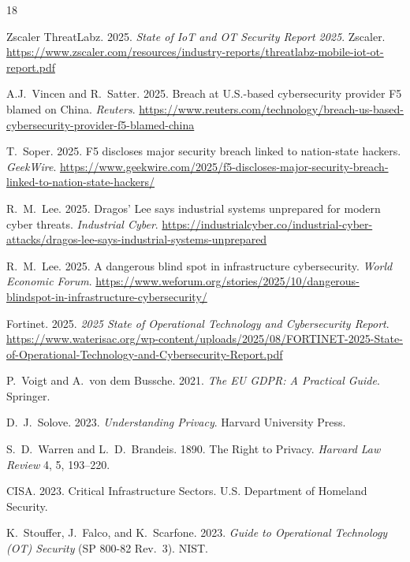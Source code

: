 \documentclass[sigconf,nonacm]{acmart}
\begin{document}
\sloppy

\begin{thebibliography}{18}

Zscaler ThreatLabz. 2025. \textit{State of IoT and OT Security Report 2025}. Zscaler.
\url{https://www.zscaler.com/resources/industry-reports/threatlabz-mobile-iot-ot-report.pdf}

A.J.~Vincen and R.~Satter. 2025. Breach at U.S.-based cybersecurity provider F5 blamed
on China. \textit{Reuters}.
\url{https://www.reuters.com/technology/breach-us-based-cybersecurity-provider-f5-blamed-china}

T.~Soper. 2025. F5 discloses major security breach linked to nation-state hackers.
\textit{GeekWire}.
\url{https://www.geekwire.com/2025/f5-discloses-major-security-breach-linked-to-nation-state-hackers/}

R.~M.~Lee. 2025. Dragos' Lee says industrial systems unprepared for modern cyber threats.
\textit{Industrial Cyber}.
\url{https://industrialcyber.co/industrial-cyber-attacks/dragos-lee-says-industrial-systems-unprepared}

R.~M.~Lee. 2025. A dangerous blind spot in infrastructure cybersecurity.
\textit{World Economic Forum}.
\url{https://www.weforum.org/stories/2025/10/dangerous-blindspot-in-infrastructure-cybersecurity/}

Fortinet. 2025. \textit{2025 State of Operational Technology and Cybersecurity Report}.
\url{https://www.waterisac.org/wp-content/uploads/2025/08/FORTINET-2025-State-of-Operational-Technology-and-Cybersecurity-Report.pdf}

P.~Voigt and A.~von dem Bussche. 2021. \textit{The EU GDPR: A Practical Guide}.
Springer.

D.~J.~Solove. 2023. \textit{Understanding Privacy}. Harvard University Press.

S.~D.~Warren and L.~D.~Brandeis. 1890. The Right to Privacy.
\textit{Harvard Law Review} 4, 5, 193--220.

CISA. 2023. Critical Infrastructure Sectors. U.S. Department of Homeland Security.

K.~Stouffer, J.~Falco, and K.~Scarfone. 2023. \textit{Guide to Operational Technology
(OT) Security} (SP 800-82 Rev.~3). NIST.


\end{thebibliography}
\end{document}
